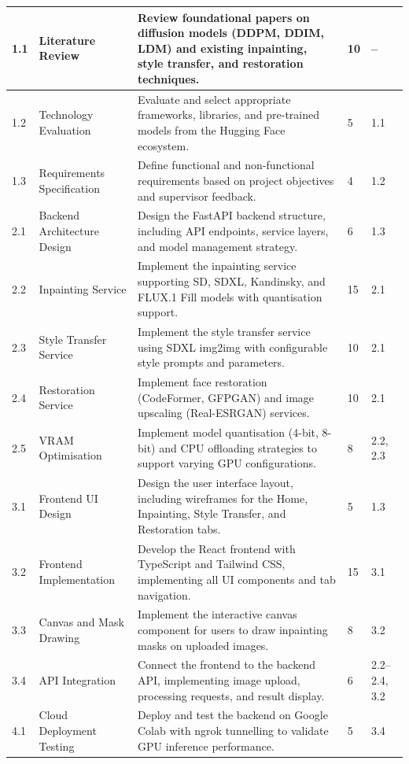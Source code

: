 \documentclass[12pt,a4paper]{report}
\begin{document}
\begin{longtable}{|p{0.6cm}|p{2.6cm}|p{5.8cm}|p{1.4cm}|p{1.8cm}|}
1.1 & Literature Review & Review foundational papers on diffusion models (DDPM, DDIM, LDM) and existing inpainting, style transfer, and restoration techniques. & 10 & -- \\
\hline
1.2 & Technology Evaluation & Evaluate and select appropriate frameworks, libraries, and pre-trained models from the Hugging Face ecosystem. & 5 & 1.1 \\
\hline
1.3 & Requirements Specification & Define functional and non-functional requirements based on project objectives and supervisor feedback. & 4 & 1.2 \\
\hline
2.1 & Backend Architecture Design & Design the FastAPI backend structure, including API endpoints, service layers, and model management strategy. & 6 & 1.3 \\
\hline
2.2 & Inpainting Service & Implement the inpainting service supporting SD, SDXL, Kandinsky, and FLUX.1 Fill models with quantisation support. & 15 & 2.1 \\
\hline
2.3 & Style Transfer Service & Implement the style transfer service using SDXL img2img with configurable style prompts and parameters. & 10 & 2.1 \\
\hline
2.4 & Restoration Service & Implement face restoration (CodeFormer, GFPGAN) and image upscaling (Real-ESRGAN) services. & 10 & 2.1 \\
\hline
2.5 & VRAM Optimisation & Implement model quantisation (4-bit, 8-bit) and CPU offloading strategies to support varying GPU configurations. & 8 & 2.2, 2.3 \\
\hline
3.1 & Frontend UI Design & Design the user interface layout, including wireframes for the Home, Inpainting, Style Transfer, and Restoration tabs. & 5 & 1.3 \\
\hline
3.2 & Frontend Implementation & Develop the React frontend with TypeScript and Tailwind CSS, implementing all UI components and tab navigation. & 15 & 3.1 \\
\hline
3.3 & Canvas and Mask Drawing & Implement the interactive canvas component for users to draw inpainting masks on uploaded images. & 8 & 3.2 \\
\hline
3.4 & API Integration & Connect the frontend to the backend API, implementing image upload, processing requests, and result display. & 6 & 2.2--2.4, 3.2 \\
\hline
4.1 & Cloud Deployment Testing & Deploy and test the backend on Google Colab with ngrok tunnelling to validate GPU inference performance. & 5 & 3.4 \\

\end{longtable}
\end{document}
